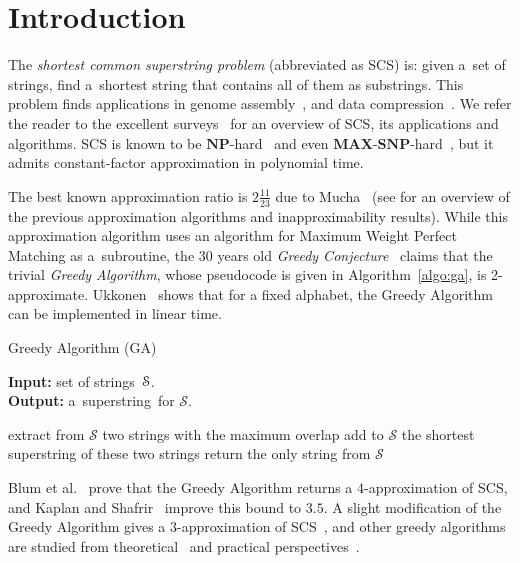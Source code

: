 \section{Introduction}
\label{sec:intro}
The {\em shortest common superstring problem} (abbreviated as SCS) is:
given a~set of strings, find a~shortest string that contains all of them as
substrings. This problem finds applications in genome assembly~\cite{waterman1995introduction, pevzner2001eulerian}, and data compression~\cite{GMS1980, phdthesis, storer1987data}. We refer the reader to the excellent surveys~\cite{gevezes2014shortest, mucha2007tutorial} for an overview of SCS, its applications and algorithms.  SCS is known to be $\mathbf{NP}$-hard~\cite{GMS1980} and even $\mathbf{MAX}$-$\mathbf{SNP}$-hard~\cite{BJLTY1991}, but it admits constant-factor approximation in polynomial time.

The best known approximation ratio is $2\frac{11}{23}$ due to Mucha~\cite{M2013} 
(see \cite[Section~2.1]{GKM13} for an overview of the 
previous approximation algorithms
and inapproximability results). While this approximation algorithm uses an algorithm for Maximum Weight Perfect Matching as a~subroutine, the $30$ years old \emph{Greedy Conjecture}~\cite{storer1987data, TU1988, T1989, BJLTY1991} claims that the trivial \emph{Greedy Algorithm}, whose pseudocode is given in Algorithm~\ref{algo:ga}, is 2-approximate. Ukkonen~\cite{ukkonen1990linear} shows that for a fixed alphabet, the Greedy Algorithm can be implemented in linear time.

\begin{algorithm}[ht]
\label{algo:ga}
\caption{Greedy Algorithm (GA)}
\hspace*{\algorithmicindent} \textbf{Input:} set of strings~${\cal S}$.\\
\hspace*{\algorithmicindent} \textbf{Output:} a~superstring~for $\mathcal{S}$.
\begin{algorithmic}[1]
\State extract from $\mathcal{S}$ two strings with the maximum overlap
\State add to $\mathcal{S}$ the shortest superstring of these two strings
\EndWhile
\State return the only string from $\mathcal{S}$
\end{algorithmic}
\end{algorithm}


Blum et al.~\cite{BJLTY1991} prove that the Greedy Algorithm returns a $4$-approximation of SCS, and Kaplan and Shafrir~\cite{KS2005} improve this bound to $3.5$. A slight modification of the Greedy Algorithm gives a $3$-approximation of SCS~\cite{BJLTY1991}, and other greedy algorithms are studied from theoretical~\cite{BJLTY1991,rivals2018superstrings} and practical perspectives~\cite{romero2004experimental, cazaux2018practical}.


